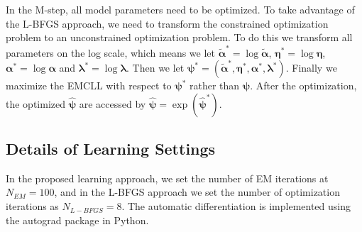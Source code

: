 \documentclass{article}
\begin{document}
In the M-step, all model parameters need to be optimized. To take advantage of the L-BFGS approach, we need to transform the constrained optimization problem to an unconstrained optimization problem. To do this we transform all parameters on the log scale, which means we let $\tilde{\bm \alpha}^* = \log {\tilde{\bm \alpha}}$, $\bm\eta^* = \log \bm \eta$, $\bm \alpha^* = \log \bm \alpha$ and $\bm \lambda^* = \log \bm \lambda$. Then we let $\bm \psi^* = (\tilde{\bm \alpha}^*, \bm \eta^*, \bm \alpha^*, \bm \lambda^*)$. Finally we maximize the EMCLL with respect to $\bm \psi^*$ rather than $\bm \psi$. After the optimization, the optimized $\hat{\bm \psi}$ are accessed by $\hat{\bm \psi} = \exp(\hat{\bm \psi}^*)$.

\subsection{Details of Learning Settings}
In the proposed learning approach, we set the number of EM iterations at $N_{EM} = 100$, and in the L-BFGS approach we set the number of optimization iterations as $N_{L-BFGS} = 8$. The automatic differentiation is implemented using the autograd package \cite{Maclaurin_2016} in Python.
\end{document}
